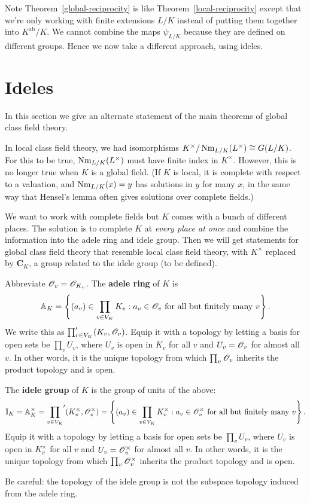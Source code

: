 Note Theorem~\ref{global-reciprocity} is like Theorem~\ref{local-reciprocity} except that we're only working with finite extensions $L/K$ instead of putting them together into $K^{\text{ab}}/K$. We cannot combine the maps $\psi_{L/K}$ because they are defined on different groups. Hence we now take a different approach, using ideles.
\section{Ideles}
In this section we give an alternate statement of the main theorems of global class field theory.

In local class field theory, we had %
isomorphisms $K^{\times}/\operatorname{Nm}_{L/K}(L^{\times})\cong G(L/K)$. For this to be true, $\operatorname{Nm}_{L/K}(L^{\times})$ must have finite index in $K^{\times}$. However, this is no longer true when $K$ is a global field. (If $K$ is local, it is complete with respect to a valuation, and $\operatorname{Nm}_{L/K}(x)=y$ has solutions in $y$ for many $x$, in the same way that Hensel's lemma often gives solutions over complete fields.)

We want to work with complete fields but $K$ comes with a bunch of different places. The solution is to complete $K$ at {\it every place at once} and combine the information into the adele ring and idele group. Then we will get statements for global class field theory that resemble local class field theory, with $K^{\times}$ replaced by $\mathbf C_K$, a group related to the idele group (to be defined).
\begin{df}
Abbreviate $\mathscr{O}_v=\mathscr{O}_{K_v}$. 
The \textbf{adele ring} of $K$ is
\[
\mathbb A_K=\left\{{
(a_v)\in \prod_{v\in V_K} K_v}:{a_v\in \mathscr{O}_{v}\text{ for all but finitely many }v}\right\}.
\]
We write this as ${\prod_{v\in V_K}'}(K_v,\mathscr{O}_v)$.
Equip it with a topology by letting a basis for open sets be $\prod_v U_v$, where $U_v$ is open in $K_v$ for all $v$ and $U_v=\mathscr{O}_v$ for almost all $v$. In other words, it is the unique topology from which $\prod_v \mathscr{O}_v$ inherits the product topology and is open.

The \textbf{idele group} of $K$ is the group of units of the above:
\[
\mathbb{I}_K=\mathbb{A}_K^{\times}={\prod_{v\in V_K}}'(K_v^{\times},\mathscr{O}_v^{\times})=\left\{{
(a_v)\in \prod_{v\in V_K} K_v^{\times}}:{a_v\in \mathscr{O}_{v}^{\times}\text{ for all but finitely many }v}\right\}.
\]
Equip it with a topology by letting a basis for open sets be $\prod_v U_v$, where $U_v$ is open in $K^{\times}_v$ for all $v$ and $U_v=\mathscr{O}_v^{\times}$ for almost all $v$. In other words, it is the unique topology from which $\prod_v \mathscr{O}_v^{\times}$ inherits the product topology and is open.
\end{df}
Be careful: the topology of the idele group is not the subspace topology induced from the adele ring.

